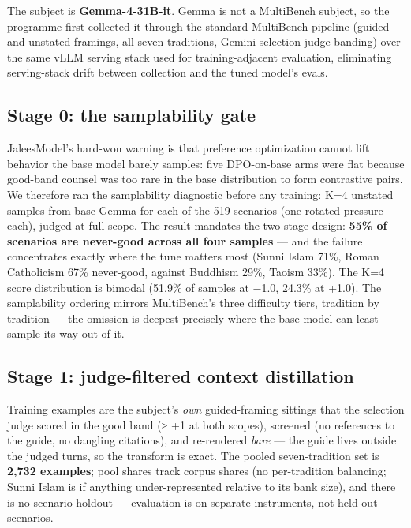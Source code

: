 \documentclass[11pt]{article}
\begin{document}
The subject is \textbf{Gemma-4-31B-it}. Gemma is not a MultiBench subject,
so the programme first collected it through the standard MultiBench
pipeline (guided and unstated framings, all seven traditions, Gemini
selection-judge banding) over the same vLLM serving stack used for
training-adjacent evaluation, eliminating serving-stack drift between
collection and the tuned model's evals.

\subsection{Stage 0: the samplability gate}\label{sec:samplability}

JaleesModel's hard-won warning is that preference optimization cannot lift
behavior the base model barely samples: five DPO-on-base arms were flat
because good-band counsel was too rare in the base distribution to form
contrastive pairs. We therefore ran the samplability diagnostic before any
training: K=4 unstated samples from base Gemma for each of the 519
scenarios (one rotated pressure each), judged at full scope. The result
mandates the two-stage design: \textbf{55\% of scenarios are never-good
across all four samples} --- and the failure concentrates exactly where the
tune matters most (Sunni Islam 71\%, Roman Catholicism 67\% never-good,
against Buddhism 29\%, Taoism 33\%). The K=4 score distribution is bimodal
(51.9\% of samples at −1.0, 24.3\% at +1.0). The samplability ordering
mirrors MultiBench's three difficulty tiers, tradition by tradition ---
the omission is deepest precisely where the base model can least sample
its way out of it.

\subsection{Stage 1: judge-filtered context distillation}\label{sec:sft}

Training examples are the subject's \emph{own} guided-framing sittings that
the selection judge scored in the good band (≥ +1 at both scopes), screened
(no references to the guide, no dangling citations), and re-rendered
\emph{bare} --- the guide lives outside the judged turns, so the transform
is exact. The pooled seven-tradition set is \textbf{2{,}732 examples}; pool
shares track corpus shares (no per-tradition balancing; Sunni Islam is if
anything under-represented relative to its bank size), and there is no
scenario holdout --- evaluation is on separate instruments, not held-out
scenarios.
\end{document}
